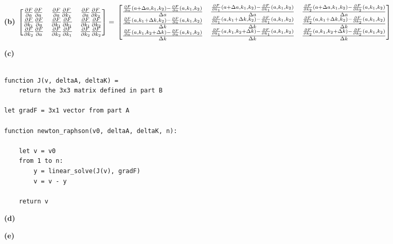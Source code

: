 \documentclass[11pt,letterpaper]{article}
\renewcommand{\part}[1] {\vspace{.10in} {\bf (#1)}}
\begin{document}
\part{b}
\newcommand{\dubpartial}[2]{\frac{\partial F}{\partial #1} \frac{\partial F}{\partial #2}}
\newcommand{\partiala}[1]{\frac{\frac{\partial F}{\partial #1}(a + \Delta a, k_1, k_2) - \frac{\partial F}{\partial #1}(a, k_1, k_2)}{\Delta a}}
\newcommand{\partialone}[1]{\frac{\frac{\partial F}{\partial #1}(a, k_1 + \Delta k, k_2) - \frac{\partial F}{\partial #1}(a, k_1, k_2)}{\Delta k}}
\newcommand{\partialtwo}[1]{\frac{\frac{\partial F}{\partial #1}(a, k_1, k_2 + \Delta k) - \frac{\partial F}{\partial #1}(a, k_1, k_2)}{\Delta k}}
$
 \begin{bmatrix}
   \dubpartial{a}{a} & \dubpartial{a}{k_1} & \dubpartial{a}{k_2} \\
   \dubpartial{k_1}{a} & \dubpartial{k_1}{k_1} & \dubpartial{k_1}{k_2} \\
   \dubpartial{k_2}{a} & \dubpartial{k_2}{k_1} & \dubpartial{k_2}{k_2}
 \end{bmatrix}
 = \\
 \begin{bmatrix}
   \partiala{a} & \partiala{k_1} & \partiala{k_2} \\
   \partialone{a} & \partialone{k_1} & \partialone{k_2} \\
   \partialtwo{a} & \partialtwo{k_1} & \partialtwo{k_2}
 \end{bmatrix}
 $

\part{c}
\begin{verbatim}

function J(v, deltaA, deltaK) =
    return the 3x3 matrix defined in part B

let gradF = 3x1 vector from part A

function newton_raphson(v0, deltaA, deltaK, n):

    let v = v0
    from 1 to n:
        y = linear_solve(J(v), gradF)
        v = v - y

    return v
\end{verbatim}

\part{d}

\part{e}
\end{document}
